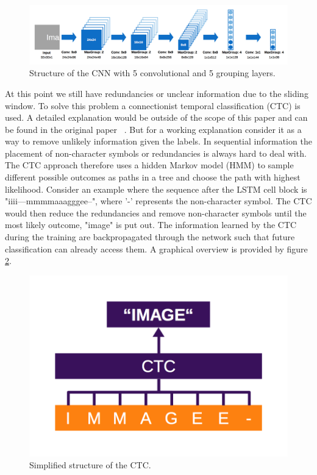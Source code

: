 \documentclass{utue} %
\begin{document}
\begin{figure}[h!]
	\centering
	\includegraphics[width=\textwidth]{graphics/model_cnn.png}
	\caption{\label{fig:cnn_structure} Structure of the CNN with 5 convolutional and 5 grouping layers.}
\end{figure}

At this point we still have redundancies or unclear information due to the sliding window. To solve this problem a connectionist temporal classification (CTC) is used. A detailed explanation would be outside of the scope of this paper and can be found in the original paper  ~\cite{Graves:2006:CTC:1143844.1143891}.
But for a working explanation consider it as a way to remove unlikely information given the labels. In sequential information the placement of non-character symbols or redundancies is always hard to deal with. The CTC approach therefore uses a hidden Markov model (HMM) to sample different possible outcomes as paths in a tree and choose the path with highest likelihood. Consider an example where the sequence after the LSTM cell block is "iiii---mmmmaaagggee--", where '-' represents the non-character symbol. The CTC would then reduce the redundancies and remove non-character symbols until the most likely outcome, "image" is put out. The information learned by the CTC during the training are backpropagated through the network such that future classification can already access them. A graphical overview is provided by figure \ref{fig:structure_ctc}. \\
\begin{figure}[h!]
	\centering
	\includegraphics[width=\columnwidth]{graphics/model_ctc.png}
	\caption{\label{fig:structure_ctc} Simplified structure of the CTC.}
\end{figure}
\end{document}
